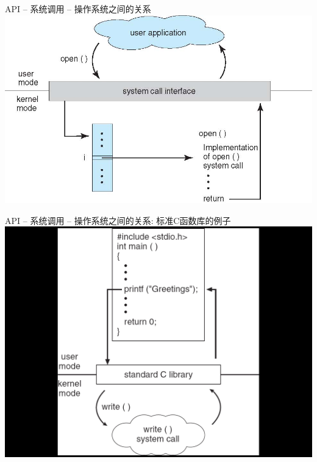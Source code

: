 \documentclass[xcolor=svgnames]{beamer}
\begin{document}
\begin{CJK*}{UTF8}{gbsn}
\begin{frame}{API -- 系统调用 -- 操作系统之间的关系}
\includegraphics[width=1.0\textwidth]{syscall-os.jpg}
\end{frame}

\begin{frame}{API -- 系统调用 -- 操作系统之间的关系: 标准C函数库的例子}
\includegraphics[width=1.0\textwidth]{printf.png}
\end{frame}


\end{CJK*}
\end{document}
